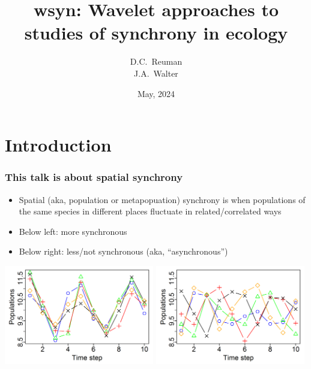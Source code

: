 \documentclass{beamer}
\title[Wavelet approaches to synchrony]
{
wsyn: Wavelet approaches to studies of synchrony in ecology
}
\author[Reuman]
{
D.C.~Reuman\inst{1} \\
J.A.~Walter\inst{2}
}
\institute
{
\inst{1}
University of Kansas \\
\inst{2}
UC Davis and University of Virginia
}
\date[KPT 2003]
{
May, 2024
}
\begin{document}
\begin{frame}
\titlepage
\end{frame}

\section{Introduction}

\begin{frame}
\frametitle{This talk is about spatial synchrony}
\begin{itemize}
\item Spatial (aka, population or metapopuation) synchrony is when populations of the same species in different places fluctuate in related/correlated ways
\item Below left: more synchronous
\item Below right: less/not synchronous (aka, ``asynchronous'')
\end{itemize}
\includegraphics[width= 0.49\textwidth]{figures/Sync.png}
\includegraphics[width= 0.49\textwidth]{figures/Asyn.png}
\end{frame}
\end{document}
